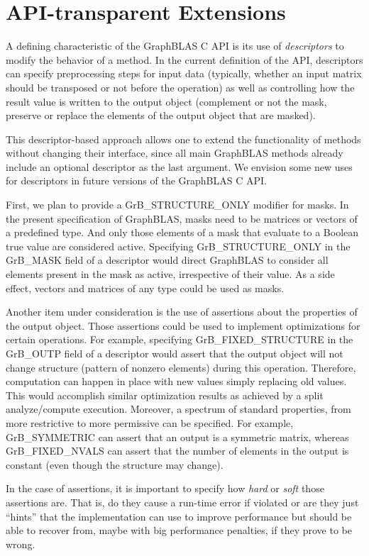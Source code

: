 \section{API-transparent Extensions}
\label{Sec:Extensions}

A defining characteristic of the GraphBLAS C API is its use of
\emph{descriptors} to modify the behavior of a method.  In the current
definition of the API, descriptors can specify preprocessing steps for
input data (typically, whether an input matrix should be transposed or
not before the operation) as well as controlling how the result value
is written to the output object (complement or not the mask, preserve
or replace the elements of the output object that are masked).

This descriptor-based approach allows one to extend the functionality of
methods without changing their interface, since all main GraphBLAS methods
already include an optional descriptor as the last argument. We envision
some new uses for descriptors in future versions of the GraphBLAS C API.

First, we plan to provide a {\sf GrB\_STRUCTURE\_ONLY} modifier for masks.
In the present specification of GraphBLAS, masks need to be matrices
or vectors of a predefined type. And only those elements of a mask
that evaluate to a Boolean {\sf true} value are considered active.
Specifying {\sf GrB\_STRUCTURE\_ONLY} in the {\sf GrB\_MASK} field of
a descriptor would direct GraphBLAS to consider all elements present
in the mask as active, irrespective of their value.  As a side effect,
vectors and matrices of any type could be used as masks.

Another item under consideration is the use of assertions about the
properties of the output object. Those assertions could be used to
implement optimizations for certain operations. For example, specifying
{\sf GrB\_FIXED\_STRUCTURE} in the {\sf GrB\_OUTP} field of a descriptor
would assert that the output object will not change structure (pattern
of nonzero elements) during this operation. Therefore, computation
can happen in place with new values simply replacing old values. This
would accomplish similar optimization results as achieved by a split
analyze/compute execution. Moreover, a spectrum of standard properties,
from more restrictive to more permissive can be specified. For example,
{\sf GrB\_SYMMETRIC} can assert that an output is a symmetric matrix,
whereas {\sf GrB\_FIXED\_NVALS} can assert that the number of elements
in the output is constant (even though the structure may change).

In the case of assertions, it is important to specify how \emph{hard}
or \emph{soft} those assertions are. That is, do they cause a run-time
error if violated or are they just ``hints'' that the implementation
can use to improve performance but should be able to recover from,
maybe with big performance penalties, if they prove to be wrong.
